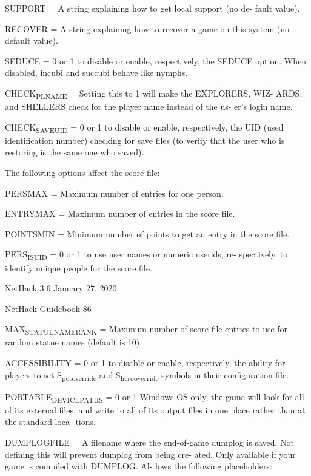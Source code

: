 \documentclass[11pt]{article}
\begin{document}
SUPPORT = A string explaining how to get local support (no de-
fault value).

RECOVER = A string explaining how to recover a game on this
system (no default value).

SEDUCE = 0 or 1 to disable or enable, respectively, the SEDUCE
option. When disabled, incubi and succubi behave like nymphs.

CHECK\textsubscript{PLNAME} = Setting this to 1 will make the EXPLORERS, WIZ-
ARDS, and SHELLERS check for the player name instead of the us-
er's login name.

CHECK\textsubscript{SAVE}\textsubscript{UID} = 0 or 1 to disable or enable, respectively, the
UID (used identification number) checking for save files (to
verify that the user who is restoring is the same one who
saved).

The following options affect the score file:

PERSMAX = Maximum number of entries for one person.

ENTRYMAX = Maximum number of entries in the score file.

POINTSMIN = Minimum number of points to get an entry in the
score file.

PERS\textsubscript{IS}\textsubscript{UID} = 0 or 1 to use user names or numeric userids, re-
spectively, to identify unique people for the score file.


NetHack 3.6                   January 27, 2020





NetHack Guidebook                       86



MAX\textsubscript{STATUENAME}\textsubscript{RANK} = Maximum number of score file entries to
use for random statue names (default is 10).

ACCESSIBILITY = 0 or 1 to disable or enable, respectively, the
ability for players to set S\textsubscript{pet}\textsubscript{override} and S\textsubscript{hero}\textsubscript{override}
symbols in their configuration file.

PORTABLE\textsubscript{DEVICE}\textsubscript{PATHS} = 0 or 1 Windows OS only, the game will
look for all of its external files, and write to all of its
output files in one place rather than at the standard loca-
tions.

DUMPLOGFILE = A filename where the end-of-game dumplog is
saved. Not defining this will prevent dumplog from being cre-
ated. Only available if your game is compiled with DUMPLOG. Al-
lows the following placeholders:
\end{document}
